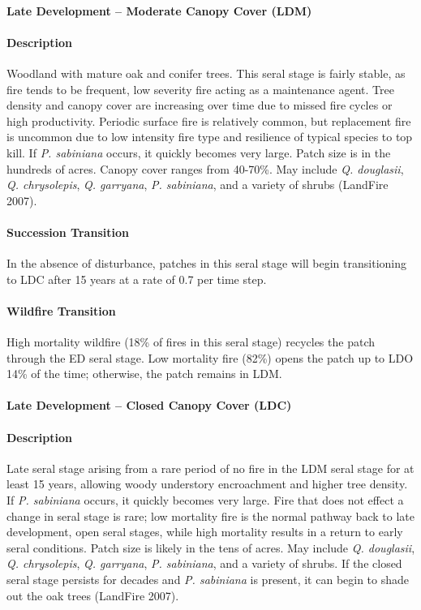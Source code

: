 \noindent\hrulefill

\paragraph{Late Development – Moderate Canopy Cover (LDM)}

\paragraph{Description} Woodland with mature oak and conifer trees. This seral stage is fairly stable, as fire tends to be frequent, low severity fire acting as a maintenance agent. Tree density and canopy cover are increasing over time due to missed fire cycles or high productivity. Periodic surface fire is relatively common, but replacement fire is uncommon due to low intensity fire type and resilience of typical species to top kill. If \emph{P. sabiniana} occurs, it quickly becomes very large. Patch size is  in the hundreds of acres. Canopy cover ranges from 40-70\%. May include \emph{Q. douglasii}, \emph{Q. chrysolepis}, \emph{Q. garryana}, \emph{P. sabiniana}, and a variety of shrubs (LandFire 2007).

\paragraph{Succession Transition} In the absence of disturbance, patches in this seral stage will begin transitioning to LDC after 15 years at a rate of 0.7 per time step. 

\paragraph{Wildfire Transition} High mortality wildfire (18\% of fires in this seral stage) recycles the patch through the ED seral stage. Low mortality fire (82\%) opens the patch up to LDO 14\% of the time; otherwise, the patch remains in LDM.

\noindent\hrulefill

\paragraph{Late Development – Closed Canopy Cover (LDC)}

\paragraph{Description} Late seral stage arising from a rare period of no fire in the LDM seral stage for at least 15 years, allowing woody understory encroachment and higher tree density. If \emph{P. sabiniana} occurs, it quickly becomes very large. Fire that does not effect a change in seral stage is rare; low mortality fire is the normal pathway back to late development, open seral stages, while high mortality results in a return to early seral conditions. Patch size is likely in the tens of acres. May include \emph{Q. douglasii}, \emph{Q. chrysolepis}, \emph{Q. garryana}, \emph{P. sabiniana}, and a variety of shrubs. If the closed seral stage persists for decades and \emph{P. sabiniana} is present, it can begin to shade out the oak trees (LandFire 2007).

